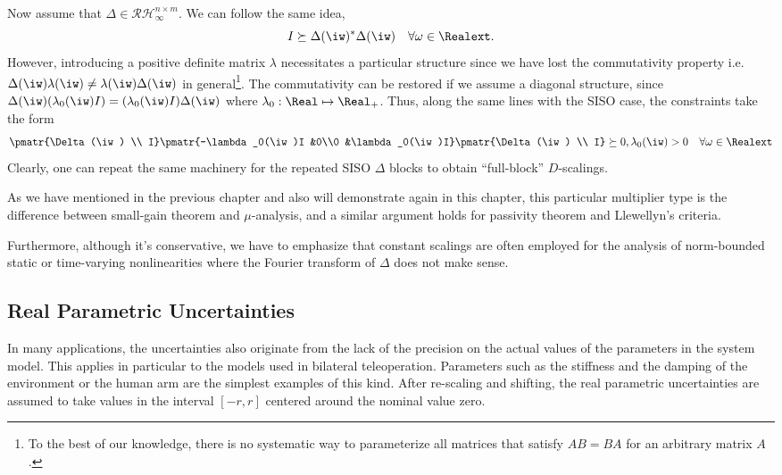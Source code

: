 Now assume that $\Delta\in\mathcal{RH}^{n\times m}_\infty$. We can follow the same idea, 
\[
I\succeq \Delta(\iw)^*\Delta(\iw) \quad \forall\omega\in\Realext.
\]
However, introducing a positive definite matrix $\lambda$ necessitates a particular structure
since we have lost the commutativity property i.e. $\Delta(\iw)\lambda(\iw) \neq \lambda(\iw)
\Delta(\iw)$ in general\footnote{To the best of our knowledge, there is no systematic way to 
parameterize all matrices that satisfy $AB=BA$ for an arbitrary matrix $A$.}. The commutativity 
can be restored if we assume a diagonal structure, since $\Delta(\iw)(\lambda_0(\iw)I) = 
(\lambda_0(\iw)I)\Delta(\iw)$ where $\lambda_0:\Real\mapsto\Real_+$. Thus, along the same lines 
with the SISO case, the constraints take the form 
\[
\pmatr{\Delta(\iw) \\ I}\pmatr{-\lambda_0(\iw)I &0\\0 &\lambda_0(\iw)I}\pmatr{\Delta(\iw) \\ I}
\succeq 0, \lambda_0(\iw)>0 \quad \forall \omega\in\Realext 
\]
Clearly, one can repeat the same machinery for the repeated SISO $\Delta$ blocks to obtain 
``full-block'' $D$-scalings. 

As we have mentioned in the previous chapter and also will demonstrate again in this chapter, 
this particular multiplier type is the difference between small-gain theorem and $\mu$-analysis,
and a similar argument holds for passivity theorem and Llewellyn's criteria.

Furthermore, although it's conservative, we have to emphasize that constant scalings are often 
employed for the analysis of norm-bounded static or time-varying nonlinearities where the Fourier 
transform of $\Delta$ does not make sense. 



\subsection{Real Parametric Uncertainties}\label{sec:ltvenv}
In many applications, the uncertainties also originate from the lack of the precision
on the actual values of the parameters in the system model. This applies in
particular to the models used in bilateral teleoperation. Parameters such as the
stiffness and the damping of the environment or the human arm are the simplest
examples of this kind. After re-scaling and shifting, the real parametric uncertainties
are assumed to take values in the interval $\left[ -r,r \right]$ centered around
the nominal value zero.

